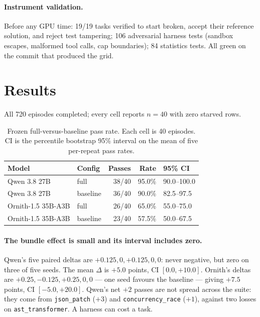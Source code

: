 \documentclass[10pt]{article}
\begin{document}
\paragraph{Instrument validation.} Before any GPU time: 19/19 tasks verified to start broken,
accept their reference solution, and reject test tampering; 106 adversarial harness tests
(sandbox escapes, malformed tool calls, cap boundaries); 84 statistics tests. All green on the
commit that produced the grid.

\section{Results}
\label{sec:results}

All 720 episodes completed; every cell reports $n{=}40$ with zero starved rows.

\begin{table}[t]
\centering
\small
\caption{Frozen full-versus-baseline pass rate. Each cell is 40 episodes. CI is the percentile
bootstrap 95\% interval on the mean of five per-repeat pass rates.}
\label{tab:main}
\begin{tabular}{llrrl}
\toprule
Model & Config & Passes & Rate & 95\% CI \\
\midrule
Qwen 3.8 27B & full & 38/40 & 95.0\% & 90.0--100.0 \\
Qwen 3.8 27B & baseline & 36/40 & 90.0\% & 82.5--97.5 \\
Ornith-1.5 35B-A3B & full & 26/40 & 65.0\% & 55.0--75.0 \\
Ornith-1.5 35B-A3B & baseline & 23/40 & 57.5\% & 50.0--67.5 \\
\bottomrule
\end{tabular}
\end{table}

\paragraph{The bundle effect is small and its interval includes zero.}
Qwen's five paired deltas are $+0.125, 0, +0.125, 0, 0$: never negative, but zero on three of
five seeds. The mean $\Delta$ is $+5.0$ points, CI $[0.0, +10.0]$. Ornith's deltas are
$+0.25, -0.125, +0.25, 0, 0$ --- one seed favours the baseline --- giving $+7.5$ points, CI
$[-5.0, +20.0]$. Qwen's net $+2$ passes are not spread across the suite: they come from
\texttt{json\_patch} ($+3$) and \texttt{concurrency\_race} ($+1$), against two losses on
\texttt{ast\_transformer}. A harness can cost a task.
\end{document}
